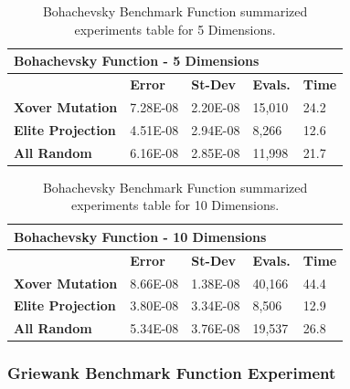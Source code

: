 \documentclass[graybox]{svmult}
\begin{document}
            \begin{table}[]
                \scriptsize
                \centering
                \caption{Bohachevsky Benchmark Function summarized experiments table for 5 Dimensions.}\label{tab.fun_bohachevsky5}
                \begin{tabular}{@{}lllll@{}}
                \toprule
                \multicolumn{5}{l}{\textbf{Bohachevsky Function - 5 Dimensions}} \\ \midrule
                & \textbf{Error} & \textbf{St-Dev} & \textbf{Evals.} & \textbf{Time} \\
                \textbf{Xover Mutation} & 7.28E-08 & 2.20E-08 & 15,010 & 24.2 \\
                \textbf{Elite Projection} & 4.51E-08 & 2.94E-08 & 8,266 & 12.6 \\
                \textbf{All Random} & 6.16E-08 & 2.85E-08 & 11,998 & 21.7 \\ \bottomrule
                \end{tabular}
                \end{table}

            \begin{table}[]
                \scriptsize
                \centering
                \caption{Bohachevsky Benchmark Function summarized experiments table for 10 Dimensions.}\label{tab.fun_bohachevsky10}
                \begin{tabular}{@{}lllll@{}}
                \toprule
                \multicolumn{5}{l}{\textbf{Bohachevsky Function - 10 Dimensions}} \\ \midrule
                & \textbf{Error} & \textbf{St-Dev} & \textbf{Evals.} & \textbf{Time} \\
                \textbf{Xover Mutation} & 8.66E-08 & 1.38E-08 & 40,166 & 44.4 \\
                \textbf{Elite Projection} & 3.80E-08 & 3.34E-08 & 8,506 & 12.9 \\
                \textbf{All Random} & 5.34E-08 & 3.76E-08 & 19,537 & 26.8 \\ \bottomrule
                \end{tabular}
                \end{table}
            
            \FloatBarrier


        \subsubsection{Griewank Benchmark Function Experiment}
\end{document}
